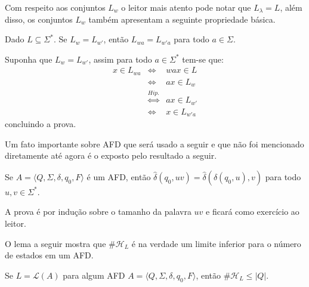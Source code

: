 Com respeito aos conjuntos $L_w$ o leitor mais atento pode notar que $L_\lambda = L$, além disso,  os conjuntos $L_w$ também apresentam a seguinte propriedade básica.

\begin{proposicao}
  Dado $L \subseteq \Sigma^*$. Se $L_w = L_{w'}$, então $L_{wa} = L_{w'a}$ para todo $a \in \Sigma$.
\end{proposicao}

\begin{prova}
	Suponha que $L_w = L_{w'}$, assim para todo $a \in \Sigma^*$ tem-se que:
	\begin{eqnarray*}
		x \in L_{wa} &\Longleftrightarrow & wax \in L\\
		& \Longleftrightarrow  & ax \in L_w\\
		& \stackrel{Hip.}{\Longleftrightarrow} & ax \in L_{w'}\\
		& \Longleftrightarrow  & x \in L_{w'a}
	\end{eqnarray*}
	concluindo a prova.
\end{prova}

Um fato importante sobre AFD que será usado a seguir e que não foi mencionado diretamente até agora é o exposto pelo resultado a seguir.

\begin{proposicao}\label{prop:AssociatividadeDelta}
	Se $A = \langle Q, \Sigma, \delta, q_0, F\rangle$ é um AFD, então $\widehat{\delta}(q_0, uv) = \widehat{\delta}( \widehat{\delta}(q_0, u), v)$ para todo $u,v \in \Sigma^*$.
\end{proposicao}

\begin{prova}
	A prova é por indução sobre o tamanho da palavra $uv$ e ficará como exercício ao leitor.
\end{prova}

O lema a seguir mostra que $\# \mathcal{H}_L$ é na verdade um limite inferior para o número de estados em um AFD. 

\begin{lema}\label{lema:LimiteInferiorEstados}
	Se $L = \mathcal{L}(A)$ para algum AFD $A = \langle Q, \Sigma, \delta, q_0, F\rangle$, então $\# \mathcal{H}_L \leq |Q|$.
\end{lema}

